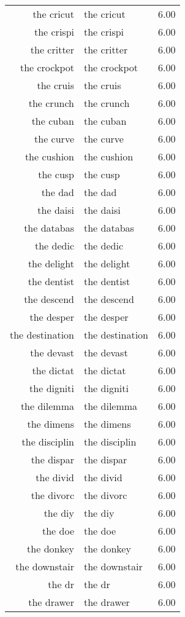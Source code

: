 \begin{table}[ht]
\begin{tabular}{rlr}
  the cricut & the cricut & 6.00 \\ 
  the crispi & the crispi & 6.00 \\ 
  the critter & the critter & 6.00 \\ 
  the crockpot & the crockpot & 6.00 \\ 
  the cruis & the cruis & 6.00 \\ 
  the crunch & the crunch & 6.00 \\ 
  the cuban & the cuban & 6.00 \\ 
  the curve & the curve & 6.00 \\ 
  the cushion & the cushion & 6.00 \\ 
  the cusp & the cusp & 6.00 \\ 
  the dad & the dad & 6.00 \\ 
  the daisi & the daisi & 6.00 \\ 
  the databas & the databas & 6.00 \\ 
  the dedic & the dedic & 6.00 \\ 
  the delight & the delight & 6.00 \\ 
  the dentist & the dentist & 6.00 \\ 
  the descend & the descend & 6.00 \\ 
  the desper & the desper & 6.00 \\ 
  the destination & the destination & 6.00 \\ 
  the devast & the devast & 6.00 \\ 
  the dictat & the dictat & 6.00 \\ 
  the digniti & the digniti & 6.00 \\ 
  the dilemma & the dilemma & 6.00 \\ 
  the dimens & the dimens & 6.00 \\ 
  the disciplin & the disciplin & 6.00 \\ 
  the dispar & the dispar & 6.00 \\ 
  the divid & the divid & 6.00 \\ 
  the divorc & the divorc & 6.00 \\ 
  the diy & the diy & 6.00 \\ 
  the doe & the doe & 6.00 \\ 
  the donkey & the donkey & 6.00 \\ 
  the downstair & the downstair & 6.00 \\ 
  the dr & the dr & 6.00 \\ 
  the drawer & the drawer & 6.00 \\ 

\end{tabular}
\end{table}
